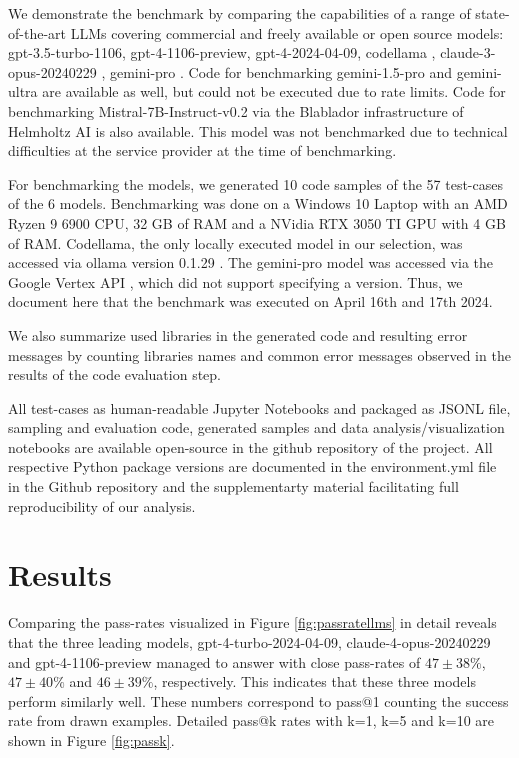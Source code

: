 \documentclass{ecai}
\begin{document}
We demonstrate the benchmark by comparing the capabilities of a range of state-of-the-art LLMs covering commercial and freely available or open source models: gpt-3.5-turbo-1106, gpt-4-1106-preview, gpt-4-2024-04-09, codellama \citep{roziere2024code}, claude-3-opus-20240229 \citep{anthropic2024claude}, gemini-pro \citep{geminiteam2024gemini}. Code for benchmarking gemini-1.5-pro and gemini-ultra are available as well, but could not be executed due to rate limits. Code for benchmarking Mistral-7B-Instruct-v0.2 \citep{jiang2023mistral} via the Blablador infrastructure of Helmholtz AI is also available. This model was not benchmarked due to technical difficulties at the service provider at the time of benchmarking.

For benchmarking the models, we generated 10 code samples of the 57 test-cases of the 6 models. Benchmarking was done on a Windows 10 Laptop with an AMD Ryzen 9 6900 CPU, 32 GB of RAM and a NVidia RTX 3050 TI GPU with 4 GB of RAM. Codellama, the only locally executed model in our selection, was accessed via ollama version 0.1.29 \citep{ollama2024windows}. The gemini-pro model was accessed via the Google Vertex API \citep{google2024vertex}, which did not support specifying a version. Thus, we document here that the benchmark was executed on April 16th and 17th 2024. 

We also summarize used libraries in the generated code and resulting error messages by counting libraries names and common error messages observed in the results of the code evaluation step.

All test-cases as human-readable Jupyter Notebooks and packaged as JSONL file, sampling and evaluation code, generated samples and data analysis/visualization notebooks are available open-source in the github repository of the project. All respective Python package versions are documented in the environment.yml file in the Github repository and the supplementarty material facilitating full reproducibility of our analysis.





\section{Results}

Comparing the pass-rates visualized in Figure \ref{fig:passratellms} in detail reveals that the three leading models, gpt-4-turbo-2024-04-09, claude-4-opus-20240229 and gpt-4-1106-preview managed to answer with close pass-rates of $47\pm38\%$, $47\pm40\%$ and $46\pm39\%$, respectively. This indicates that these three models perform similarly well. These numbers correspond to pass@1 counting the success rate from drawn examples. Detailed pass@k rates with k=1, k=5 and k=10 are shown in Figure \ref{fig:passk}.
\end{document}
